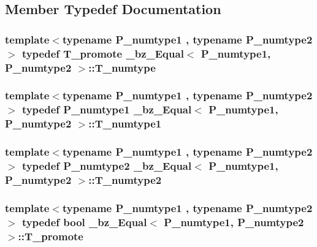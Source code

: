\subsection{Member Typedef Documentation}
\hypertarget{class__bz__Equal_a2084ac2a57dc930cf39f71ad99a96dfc}{}
\subsubsection[{T\+\_\+numtype}]{\setlength{\rightskip}{0pt plus 5cm}template$<$typename P\+\_\+numtype1 , typename P\+\_\+numtype2 $>$ typedef {\bf T\+\_\+promote} {\bf \+\_\+bz\+\_\+\+Equal}$<$ P\+\_\+numtype1, P\+\_\+numtype2 $>$\+::{\bf T\+\_\+numtype}}\label{class__bz__Equal_a2084ac2a57dc930cf39f71ad99a96dfc}
\hypertarget{class__bz__Equal_a35f064580355c9d55081ce1c2f92dacd}{}
\subsubsection[{T\+\_\+numtype1}]{\setlength{\rightskip}{0pt plus 5cm}template$<$typename P\+\_\+numtype1 , typename P\+\_\+numtype2 $>$ typedef P\+\_\+numtype1 {\bf \+\_\+bz\+\_\+\+Equal}$<$ P\+\_\+numtype1, P\+\_\+numtype2 $>$\+::{\bf T\+\_\+numtype1}}\label{class__bz__Equal_a35f064580355c9d55081ce1c2f92dacd}
\hypertarget{class__bz__Equal_a26fe90ebaa67c328304b7dc1359a3673}{}
\subsubsection[{T\+\_\+numtype2}]{\setlength{\rightskip}{0pt plus 5cm}template$<$typename P\+\_\+numtype1 , typename P\+\_\+numtype2 $>$ typedef P\+\_\+numtype2 {\bf \+\_\+bz\+\_\+\+Equal}$<$ P\+\_\+numtype1, P\+\_\+numtype2 $>$\+::{\bf T\+\_\+numtype2}}\label{class__bz__Equal_a26fe90ebaa67c328304b7dc1359a3673}
\hypertarget{class__bz__Equal_aeba9102c0e4e3907384094171fe1a6da}{}
\subsubsection[{T\+\_\+promote}]{\setlength{\rightskip}{0pt plus 5cm}template$<$typename P\+\_\+numtype1 , typename P\+\_\+numtype2 $>$ typedef {\bf bool} {\bf \+\_\+bz\+\_\+\+Equal}$<$ P\+\_\+numtype1, P\+\_\+numtype2 $>$\+::{\bf T\+\_\+promote}}\label{class__bz__Equal_aeba9102c0e4e3907384094171fe1a6da}


